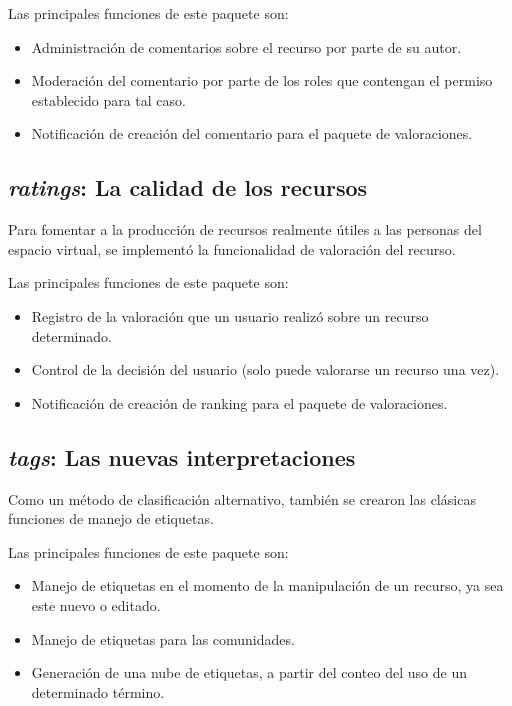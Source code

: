 Las principales funciones de este paquete son:

\begin{itemize}
\item Administración de comentarios sobre el recurso por parte de su autor.
\item Moderación del comentario por parte de los roles que contengan el permiso
establecido para tal caso.
\item Notificación de creación del comentario para el paquete de valoraciones.
\end{itemize}

\subsection{\emph{ratings}: La calidad de los recursos}
Para fomentar a la producción de recursos realmente útiles a las personas del
espacio virtual, se implementó la funcionalidad de valoración del recurso.

Las principales funciones de este paquete son:

\begin{itemize}
\item Registro de la valoración que un usuario realizó sobre un recurso
determinado.
\item Control de la decisión del usuario (solo puede valorarse un recurso una
vez).
\item Notificación de creación de ranking para el paquete de valoraciones.
\end{itemize}

\subsection{\emph{tags}: Las nuevas interpretaciones}
Como un método de clasificación alternativo, también se crearon las clásicas
funciones de manejo de etiquetas.

Las principales funciones de este paquete son:

\begin{itemize}
\item Manejo de etiquetas en el momento de la manipulación de un recurso, ya sea
este nuevo o editado.
\item Manejo de etiquetas para las comunidades.
\item Generación de una nube de etiquetas, a partir del conteo del uso de un
determinado término.
\end{itemize}

